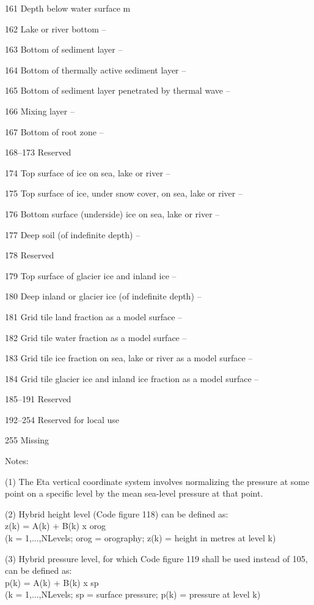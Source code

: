 161 Depth below water surface m

162 Lake or river bottom --

163 Bottom of sediment layer --

164 Bottom of thermally active sediment layer --

165 Bottom of sediment layer penetrated by thermal wave --

166 Mixing layer --

167 Bottom of root zone --

168--173 Reserved

174 Top surface of ice on sea, lake or river --

175 Top surface of ice, under snow cover, on sea, lake or river --

176 Bottom surface (underside) ice on sea, lake or river --

177 Deep soil (of indefinite depth) --

178 Reserved

179 Top surface of glacier ice and inland ice --

180 Deep inland or glacier ice (of indefinite depth) --

181 Grid tile land fraction as a model surface --

182 Grid tile water fraction as a model surface --

183 Grid tile ice fraction on sea, lake or river as a model surface --

184 Grid tile glacier ice and inland ice fraction as a model surface --

185--191 Reserved

192--254 Reserved for local use

255 Missing

Notes:

(1) The Eta vertical coordinate system involves normalizing the pressure at some point on a specific level by the mean sea-level pressure at that point.

(2) Hybrid height level (Code figure 118) can be defined as:\\
z(k) = A(k) + B(k) x orog\\
(k = 1,...,NLevels; orog = orography; z(k) = height in metres at level k)

(3) Hybrid pressure level, for which Code figure 119 shall be used instead of 105, can be defined as:\\
p(k) = A(k) + B(k) x sp\\
(k = 1,...,NLevels; sp = surface pressure; p(k) = pressure at level k)

